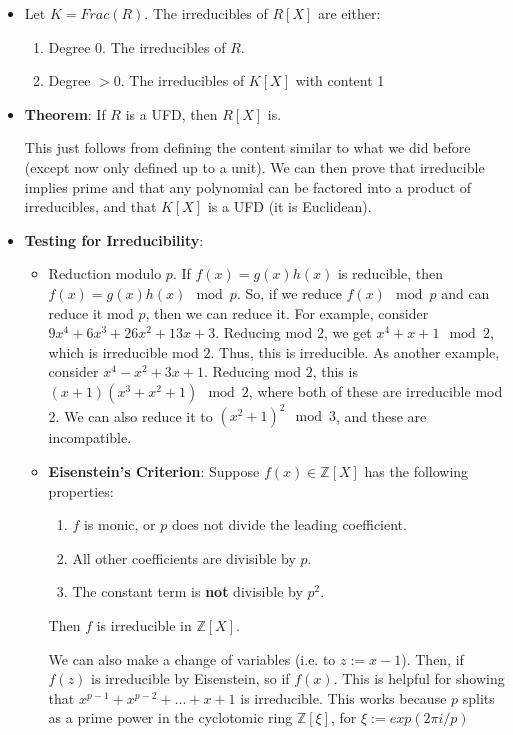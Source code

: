 \documentclass[11pt, oneside]{amsart}   	%
\theoremstyle{definition}
\begin{document}
\begin{itemize}
	\item Let $K = Frac(R)$. The irreducibles of $R[X]$ are either:
	\begin{enumerate}
		\item Degree $0$. The irreducibles of $R$.
		\item Degree $> 0$. The irreducibles of $K[X]$ with content 1
	\end{enumerate}
	
	\item \textbf{Theorem}: If $R$ is a UFD, then $R[X]$ is.
	
	This just follows from defining the content similar to what we did before (except now only defined up to a unit). We can then prove that irreducible 
	implies prime and that any polynomial can be factored into a product of irreducibles, and that $K[X]$ is a UFD (it is Euclidean). 
	
	\item \textbf{Testing for Irreducibility}: 
	\begin{itemize}
	
		\item Reduction modulo $p$. If $f(x) = g(x)h(x)$ is reducible, then $f(x) = g(x)h(x)\mod p$. So, if we reduce $f(x) \mod p$ and can reduce it mod 
		$p$, then we can reduce it. For example, consider $9x^4 + 6x^3 + 26x^2 + 13x + 3$. Reducing mod $2$, we get $x^4 + x + 1\mod 2$, which is 
		irreducible mod $2$. Thus, this is irreducible. As another example, consider $x^4 - x^2 + 3x + 1$. Reducing mod $2$, this is $(x + 1)(x^3 + 
		x^2 + 1) \mod 2$, where both of these are irreducible mod 2. We can also reduce it to $(x^2 + 1)^2\mod 3$, and these are incompatible.
		
		\item \textbf{Eisenstein's Criterion}: Suppose $f(x)\in\mathbb Z[X]$ has the following properties:
			\begin{enumerate}
				\item $f$ is monic, or $p$ does not divide the leading coefficient.
				\item All other coefficients are divisible by $p$.
				\item The constant term is \textbf{not} divisible by $p^2$.
			\end{enumerate}
			
			Then $f$ is irreducible in $\mathbb Z[X]$. 
			
			We can also make a change of variables (i.e. to $z := x - 1$). Then, if $f(z)$ is irreducible by Eisenstein, so if $f(x)$. This is helpful 
			for showing that $x^{p - 1} + x^{p - 2} + ... + x + 1$ is irreducible. This works because $p$ splits as a prime power in the cyclotomic 
			ring $\mathbb Z[\xi]$, for $\xi := exp(2\pi i / p)$
	
	\end{itemize}

\end{itemize}
\end{document}
